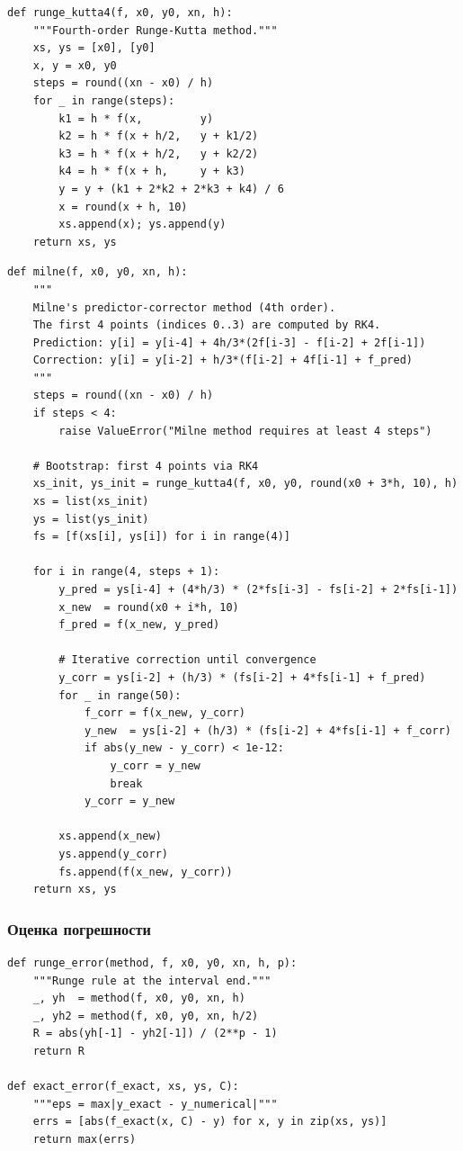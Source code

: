\documentclass[a4paper,12pt]{article}
\begin{document}
\begin{lstlisting}[style=intellij, caption={Метод Рунге--Кутта 4-го порядка}]
def runge_kutta4(f, x0, y0, xn, h):
    """Fourth-order Runge-Kutta method."""
    xs, ys = [x0], [y0]
    x, y = x0, y0
    steps = round((xn - x0) / h)
    for _ in range(steps):
        k1 = h * f(x,         y)
        k2 = h * f(x + h/2,   y + k1/2)
        k3 = h * f(x + h/2,   y + k2/2)
        k4 = h * f(x + h,     y + k3)
        y = y + (k1 + 2*k2 + 2*k3 + k4) / 6
        x = round(x + h, 10)
        xs.append(x); ys.append(y)
    return xs, ys
\end{lstlisting}

\begin{lstlisting}[style=intellij, caption={Метод Милна (прогноз-коррекция)}]
def milne(f, x0, y0, xn, h):
    """
    Milne's predictor-corrector method (4th order).
    The first 4 points (indices 0..3) are computed by RK4.
    Prediction: y[i] = y[i-4] + 4h/3*(2f[i-3] - f[i-2] + 2f[i-1])
    Correction: y[i] = y[i-2] + h/3*(f[i-2] + 4f[i-1] + f_pred)
    """
    steps = round((xn - x0) / h)
    if steps < 4:
        raise ValueError("Milne method requires at least 4 steps")

    # Bootstrap: first 4 points via RK4
    xs_init, ys_init = runge_kutta4(f, x0, y0, round(x0 + 3*h, 10), h)
    xs = list(xs_init)
    ys = list(ys_init)
    fs = [f(xs[i], ys[i]) for i in range(4)]

    for i in range(4, steps + 1):
        y_pred = ys[i-4] + (4*h/3) * (2*fs[i-3] - fs[i-2] + 2*fs[i-1])
        x_new  = round(x0 + i*h, 10)
        f_pred = f(x_new, y_pred)

        # Iterative correction until convergence
        y_corr = ys[i-2] + (h/3) * (fs[i-2] + 4*fs[i-1] + f_pred)
        for _ in range(50):
            f_corr = f(x_new, y_corr)
            y_new  = ys[i-2] + (h/3) * (fs[i-2] + 4*fs[i-1] + f_corr)
            if abs(y_new - y_corr) < 1e-12:
                y_corr = y_new
                break
            y_corr = y_new

        xs.append(x_new)
        ys.append(y_corr)
        fs.append(f(x_new, y_corr))
    return xs, ys
\end{lstlisting}

\subsubsection{Оценка погрешности}

\begin{lstlisting}[style=intellij, caption={Правило Рунге и max-погрешность}]
def runge_error(method, f, x0, y0, xn, h, p):
    """Runge rule at the interval end."""
    _, yh  = method(f, x0, y0, xn, h)
    _, yh2 = method(f, x0, y0, xn, h/2)
    R = abs(yh[-1] - yh2[-1]) / (2**p - 1)
    return R

def exact_error(f_exact, xs, ys, C):
    """eps = max|y_exact - y_numerical|"""
    errs = [abs(f_exact(x, C) - y) for x, y in zip(xs, ys)]
    return max(errs)
\end{lstlisting}
\end{document}
